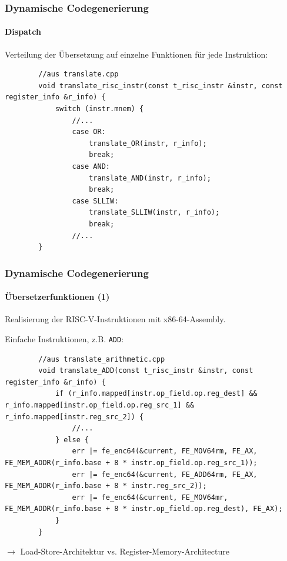 \documentclass[german]{tum-presentation}
\newcommand{\refer}[0]{\ensuremath{\rightarrow} }
\begin{document}
%	
%	

\begin{frame}[fragile]
	\frametitle{Dynamische Codegenerierung}
	\framesubtitle{Dispatch}
	
	Verteilung der Übersetzung auf einzelne Funktionen für jede Instruktion:
	
	\begin{lstlisting}
		//aus translate.cpp
		void translate_risc_instr(const t_risc_instr &instr, const register_info &r_info) {
			switch (instr.mnem) {
				//...
				case OR:
					translate_OR(instr, r_info);
					break;
				case AND:
					translate_AND(instr, r_info);
					break;
				case SLLIW:
					translate_SLLIW(instr, r_info);
					break;
				//...
		}
	\end{lstlisting}
\end{frame}

\begin{frame}[fragile]
	\frametitle{Dynamische Codegenerierung}
	\framesubtitle{Übersetzerfunktionen (1)}
	
	Realisierung der RISC-V-Instruktionen mit x86-64-Assembly.
	
	\pause
	\vspace{0.3cm}
	Einfache Instruktionen, z.B. \verb!ADD!:
	\begin{lstlisting}
		//aus translate_arithmetic.cpp
		void translate_ADD(const t_risc_instr &instr, const register_info &r_info) {
			if (r_info.mapped[instr.op_field.op.reg_dest] && r_info.mapped[instr.op_field.op.reg_src_1] && r_info.mapped[instr.reg_src_2]) {
				//...
			} else {
				err |= fe_enc64(&current, FE_MOV64rm, FE_AX, FE_MEM_ADDR(r_info.base + 8 * instr.op_field.op.reg_src_1));
				err |= fe_enc64(&current, FE_ADD64rm, FE_AX, FE_MEM_ADDR(r_info.base + 8 * instr.reg_src_2));
				err |= fe_enc64(&current, FE_MOV64mr, FE_MEM_ADDR(r_info.base + 8 * instr.op_field.op.reg_dest), FE_AX);
			}
		}
	\end{lstlisting}
	
	\refer Load-Store-Architektur vs. Register-Memory-Architecture
\end{frame}
\end{document}
